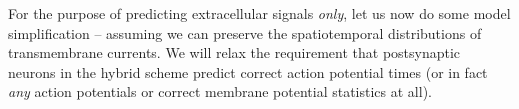 For the purpose of predicting extracellular signals \emph{only}, 
let us now do some model simplification -- assuming we can preserve the  spatiotemporal distributions of transmembrane currents. 
We will relax the requirement 
that postsynaptic neurons in the hybrid scheme predict correct action potential times (or in fact \emph{any} action potentials or correct membrane potential statistics at all). 

